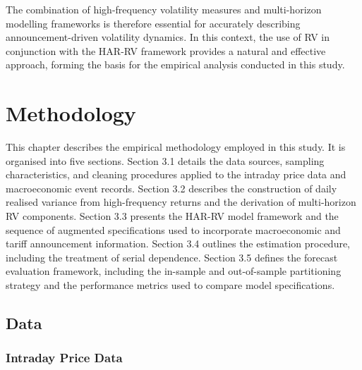 \documentclass[12pt,a4paper]{report}
\begin{document}
The combination of high-frequency volatility measures and multi-horizon modelling frameworks is therefore essential for accurately describing announcement-driven volatility dynamics. In this context, the use of RV in conjunction with the HAR-RV framework provides a natural and effective approach, forming the basis for the empirical analysis conducted in this study.

\chapter{Methodology}
This chapter describes the empirical methodology employed in this study. It is organised into five sections. Section 3.1 details the data sources, sampling characteristics, and cleaning procedures applied to the intraday price data and macroeconomic event records. Section 3.2 describes the construction of daily realised variance from high-frequency returns and the derivation of multi-horizon RV components. Section 3.3 presents the HAR-RV model framework and the sequence of augmented specifications used to incorporate macroeconomic and tariff announcement information. Section 3.4 outlines the estimation procedure, including the treatment of serial dependence. Section 3.5 defines the forecast evaluation framework, including the in-sample and out-of-sample partitioning strategy and the performance metrics used to compare model specifications.

\section{Data}
\subsection{Intraday Price Data}
\end{document}
